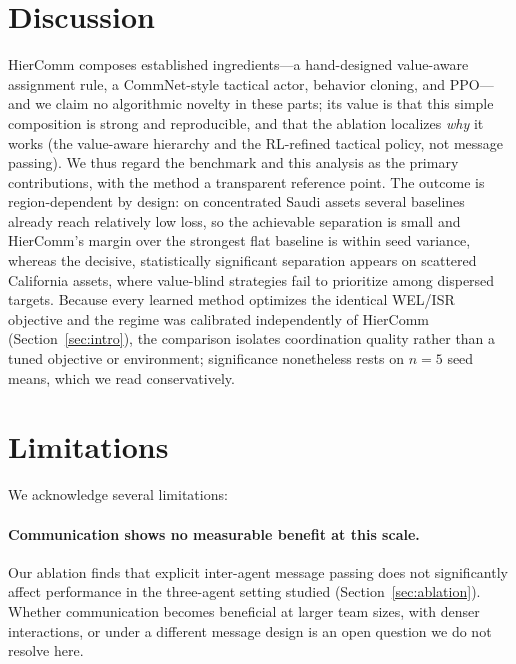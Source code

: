 \documentclass[letterpaper]{article}
\begin{document}
\section{Discussion}
\label{sec:discussion}

HierComm composes established ingredients---a hand-designed value-aware assignment rule, a CommNet-style tactical actor, behavior cloning, and PPO---and we claim no algorithmic novelty in these parts; its value is that this simple composition is strong and reproducible, and that the ablation localizes \emph{why} it works (the value-aware hierarchy and the RL-refined tactical policy, not message passing). We thus regard the benchmark and this analysis as the primary contributions, with the method a transparent reference point. The outcome is region-dependent by design: on concentrated Saudi assets several baselines already reach relatively low loss, so the achievable separation is small and HierComm's margin over the strongest flat baseline is within seed variance, whereas the decisive, statistically significant separation appears on scattered California assets, where value-blind strategies fail to prioritize among dispersed targets. Because every learned method optimizes the identical WEL/ISR objective and the regime was calibrated independently of HierComm (Section~\ref{sec:intro}), the comparison isolates coordination quality rather than a tuned objective or environment; significance nonetheless rests on $n=5$ seed means, which we read conservatively.

\section{Limitations}
\label{sec:limitations}

We acknowledge several limitations:

\paragraph{Communication shows no measurable benefit at this scale.}
Our ablation finds that explicit inter-agent message passing does not significantly affect performance in the three-agent setting studied (Section~\ref{sec:ablation}). Whether communication becomes beneficial at larger team sizes, with denser interactions, or under a different message design is an open question we do not resolve here.
\end{document}
